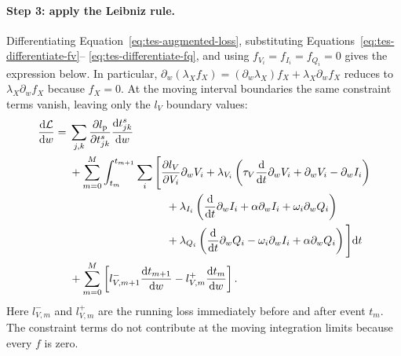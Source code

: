 \paragraph{Step 3: apply the Leibniz rule.}
Differentiating Equation~\eqref{eq:tes-augmented-loss}, substituting
Equations~\eqref{eq:tes-differentiate-fv}--
\eqref{eq:tes-differentiate-fq}, and using $f_{V_i}=f_{I_i}=f_{Q_i}=0$
gives the expression below. In particular,
$\partial_w(\lambda_X f_X)
=(\partial_w\lambda_X)f_X+\lambda_X\partial_wf_X$ reduces to
$\lambda_X\partial_wf_X$ because $f_X=0$. At the moving interval boundaries
the same constraint terms vanish, leaving only the $l_V$ boundary values:
\begin{align}
    \frac{\mathrm d\mathcal L}{\mathrm dw}
    ={}&\sum_{j,k}
       \frac{\partial l_{\mathrm p}}{\partial t^s_{jk}}
       \frac{\mathrm dt^s_{jk}}{\mathrm dw}
       \nonumber\\
    &+\sum_{m=0}^{M}\int_{t_m}^{t_{m+1}}
      \sum_i\Bigg[
       \frac{\partial l_V}{\partial V_i}\partial_w V_i
       +\lambda_{V_i}\left(
          \tau_V\frac{\mathrm d}{\mathrm dt}\partial_w V_i
          +\partial_w V_i-\partial_w I_i\right)
       \nonumber\\
    &\hspace{31mm}
       +\lambda_{I_i}\left(
          \frac{\mathrm d}{\mathrm dt}\partial_w I_i
          +\alpha\partial_w I_i+\omega_i\partial_w Q_i\right)
       \nonumber\\
    &\hspace{31mm}
       +\lambda_{Q_i}\left(
          \frac{\mathrm d}{\mathrm dt}\partial_w Q_i
          -\omega_i\partial_w I_i+\alpha\partial_w Q_i\right)
      \Bigg]\mathrm dt
      \nonumber\\
    &+\sum_{m=0}^{M}\left[
       l_{V,m+1}^-\frac{\mathrm dt_{m+1}}{\mathrm dw}
       -l_{V,m}^+\frac{\mathrm dt_m}{\mathrm dw}
      \right].
    \label{eq:tes-gradient-before-parts}
\end{align}
Here $l_{V,m}^{-}$ and $l_{V,m}^{+}$ are the running loss immediately before
and after event $t_m$. The constraint terms do not contribute at the moving
integration limits because every $f$ is zero.

